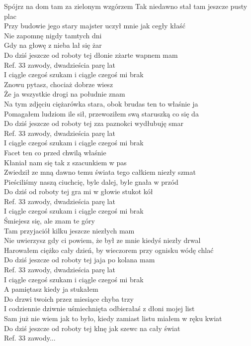 
Spójrz na dom tam za zielonym wzgórzem \tab{}  \newline
Tak niedawno stał tam jeszcze pusty plac \tab{}\\
Przy budowie jego stary majster uczył mnie jak cegły kłaść \\
Nie zapomnę nigdy tamtych dni \tab{} \\
Gdy na głowę z nieba lał się żar \tab{}\\
Do dziś jeszcze od roboty tej dłonie zżarte wapnem mam \\
\hops
Ref. 33 zawody, dwadzieścia parę lat \tab{}\\
 I ciągle czegoś szukam i ciągle czegoś mi brak \\
\hops
Znowu pytasz, chociaż dobrze wiesz\\
Że ja wszystkie drogi na południe znam\\
Na tym zdjęciu ciężarówka stara, obok brudas ten to właśnie ja\\
Pomagałem ludziom ile sił, przewoziłem swą staruszką co się da\\
Do dziś jeszcze od roboty tej zza paznokci wydłubuję smar\\
\hops
Ref. 33 zawody, dwadzieścia parę lat\\
 I ciągle czegoś szukam i ciągle czegoś mi brak\\
\hops
Facet ten co przed chwilą właśnie\\
Kłaniał nam się tak z szacunkiem w pas\\
Zwiedził ze mną dawno temu świata tego całkiem niezły szmat\\
Pieściliśmy naszą ciuchcię, byle dalej, byle gnała w przód\\
Do dziś od roboty tej gra mi w głowie stukot kół\\
\hops
Ref. 33 zawody, dwadzieścia parę lat\\
 I ciągle czegoś szukam i ciągle czegoś mi brak\\
\hops
Śmiejesz się, ale znam te góry\\
Tam przyjaciół kilku jeszcze niezłych mam\\
Nie uwierzysz gdy ci powiem, że był ze mnie kiedyś niezły drwal\\
Harowałem ciężko cały dzień, by wieczorem przy ognisku wódę chlać\\
Do dziś jeszcze od roboty tej jaja po kolana mam\\
\hops
Ref. 33 zawody, dwadzieścia parę lat\\
 I ciągle czegoś szukam i ciągle czegoś mi brak\\
\hops
A pamiętasz kiedy ja stukałem\\
Do drzwi twoich przez miesiące chyba trzy\\
I codziennie dziwnie uśmiechnięta odbierałaś z dłoni mojej list\\
Sam już nie wiem jak to było, kiedy zamiast listu miałem w ręku kwiat\\
Do dziś jeszcze od roboty tej klnę jak szewc na cały świat\\
\hops
Ref. 33 zawody...